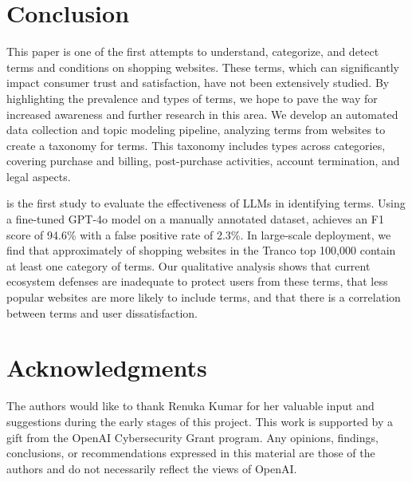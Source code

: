 \section{Conclusion}

This paper is one of the first attempts to understand, categorize, and detect \termname terms and conditions on shopping websites. These terms, which can significantly impact consumer trust and satisfaction, have not been extensively studied. By highlighting the prevalence and types of \termname terms, we hope to pave the way for increased awareness and further research in this area. We develop an automated data collection and topic modeling pipeline, analyzing \termcnt terms from \websitecnt websites to create a taxonomy for \termname terms. This taxonomy includes \termtypecnt types across \termcatcnt categories, covering purchase and billing, post-purchase activities, account termination, and legal aspects.


\platform is the first study to evaluate the effectiveness of LLMs in identifying \termname terms. Using a fine-tuned GPT-4o model on a manually annotated dataset, \platform achieves an F1 score of 94.6\% with a false positive rate of 2.3\%. In large-scale deployment, we find that approximately \websitepct of shopping websites in the Tranco top 100,000 contain at least one category of \termname terms. Our qualitative analysis shows that current ecosystem defenses are inadequate to protect users from these terms, that less popular websites are more likely to include \termname terms, and that there is a correlation between \termname terms and user dissatisfaction.





\section*{Acknowledgments}

The authors would like to thank Renuka Kumar for her valuable input and suggestions during the early stages of this project.  This work is supported by a gift from the OpenAI Cybersecurity Grant program. Any opinions, findings, conclusions, or recommendations expressed in this material are those of the authors
and do not necessarily reflect the views of OpenAI.

